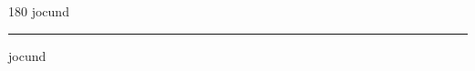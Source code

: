
\begin{frame}
\begin{center}
\begin{turn}{180}
{\fontsize{2.5cm}{1em}\selectfont jocund}
\end{turn}
\vspace{1em}\par  
\hrule
\vspace{1em}\par  
{\fontsize{2.5cm}{1em}\selectfont jocund}
\end{center}
\end{frame}
